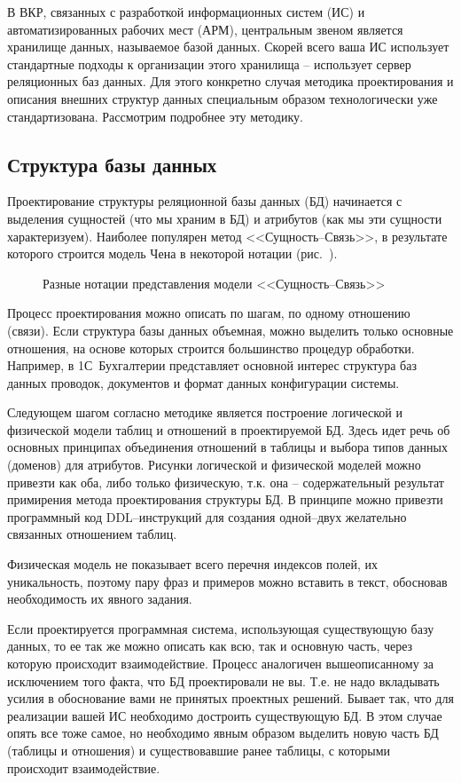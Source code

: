 \documentclass[a4paper,14pt,final]{extreport}
\begin{document}
В ВКР, связанных с разработкой информационных систем (ИС) и автоматизированных рабочих мест (АРМ), центральным звеном является хранилище данных, называемое базой данных.  Скорей всего ваша ИС использует стандартные подходы к организации этого хранилища -- использует сервер реляционных баз данных.  Для этого конкретно случая методика проектирования и описания внешних структур данных специальным образом технологически уже стандартизована.  Рассмотрим подробнее эту методику.

\subsection{Структура базы данных}
\label{sec:databasestruct}

Проектирование структуры реляционной базы данных (БД) начинается с выделения сущностей (что мы храним в БД) и атрибутов (как мы эти сущности характеризуем).  Наиболее популярен метод <<Сущность--Связь>>, в результате которого строится модель Чена в некоторой нотации (рис.~).
\begin{figure}[hbt]
  \centering

  \caption[Нотации для модели Чена]{Разные нотации представления модели <<Сущность--Связь>>}
  \label{fig:changmodels}
\end{figure}
Процесс проектирования можно описать по шагам, по одному отношению (связи).  Если структура базы данных объемная, можно выделить только основные отношения, на основе которых строится большинство процедур обработки.  Например, в 1С~Бухгалтерии представляет основной интерес структура баз данных проводок, документов и формат данных конфигурации системы.

Следующем шагом согласно методике является построение логической и физической модели таблиц и отношений в проектируемой БД.  Здесь идет речь об основных принципах объединения отношений в таблицы и выбора типов данных (доменов) для атрибутов.  Рисунки логической и физической моделей можно привезти как оба, либо только физическую, т.к. она -- содержательный результат примирения метода проектирования структуры БД.  В принципе можно привезти программный код DDL--инструкций для создания одной--двух желательно связанных отношением таблиц.

Физическая модель не показывает всего перечня индексов полей, их уникальность, поэтому пару фраз и примеров можно вставить в текст, обосновав необходимость их явного задания.

Если проектируется программная система, использующая существующую базу данных, то ее так же можно описать как всю, так и основную часть, через которую происходит взаимодействие.  Процесс аналогичен вышеописанному за исключением того факта, что БД проектировали не вы. Т.е. не надо вкладывать усилия в обоснование вами не принятых проектных решений.  Бывает так, что для реализации вашей ИС необходимо достроить существующую БД.  В этом случае опять все тоже самое, но необходимо явным образом выделить новую часть БД (таблицы и отношения) и существовавшие ранее таблицы, с которыми происходит взаимодействие.
\end{document}
